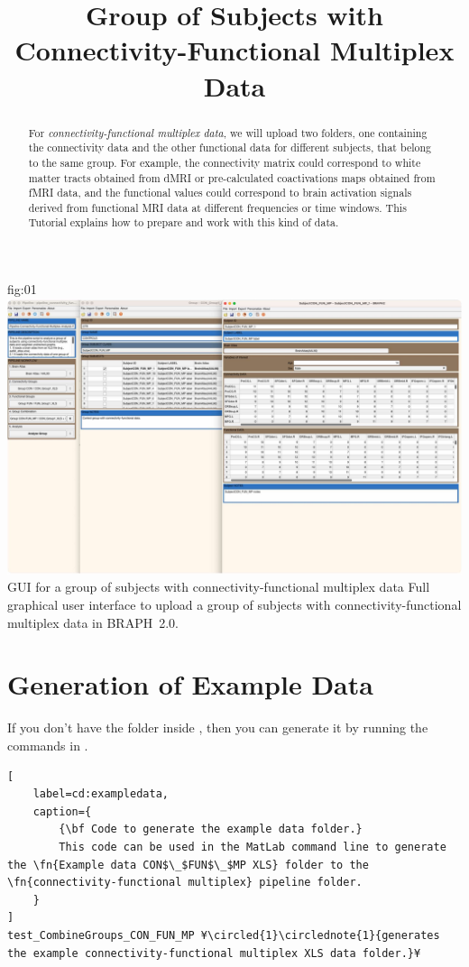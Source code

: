 \documentclass[justified]{tufte-handout}
\title{Group of Subjects with Connectivity-Functional Multiplex Data}
\begin{document}
\maketitle

\begin{abstract}
\noindent
For \emph{connectivity-functional multiplex data}, we will upload two folders, one containing the connectivity data and the other functional data for different subjects, that belong to the same group. For example, the connectivity matrix could correspond to white matter tracts obtained from dMRI or pre-calculated coactivations maps obtained from fMRI data, and the functional values could correspond to brain activation signals derived from functional MRI data at different frequencies or time windows. This Tutorial explains how to prepare and work with this kind of data.
\end{abstract}

\tableofcontents

	{fig:01}
	{\includegraphics{fig01.jpg}}
	{GUI for a group of subjects with connectivity-functional multiplex data}
	{
	Full graphical user interface to upload a group of subjects with connectivity-functional multiplex data in BRAPH~2.0. 
	}

\clearpage
\section{Generation of Example Data}

If you don't have the  folder inside , then you can generate it by running the commands in .

\begin{lstlisting}[
	label=cd:exampledata,
	caption={
		{\bf Code to generate the example data folder.}
		This code can be used in the MatLab command line to generate the \fn{Example data CON$\_$FUN$\_$MP XLS} folder to the \fn{connectivity-functional multiplex} pipeline folder.
	}
]
test_CombineGroups_CON_FUN_MP ¥\circled{1}\circlednote{1}{generates the example connectivity-functional multiplex XLS data folder.}¥
\end{lstlisting}
\end{document}
